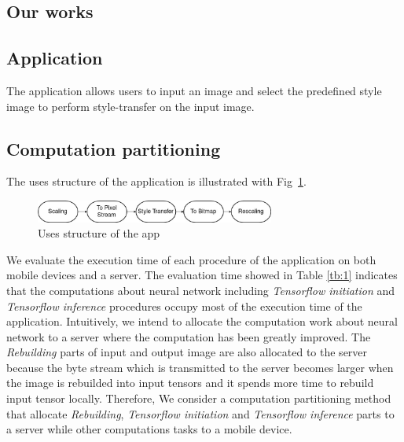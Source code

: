 \documentclass[a4paper,11pt,onecolumn,twoside]{article}
\begin{document}
\begin{CJK*}{GBK}{song}
\section{Our works}
\subsection{Application}
The application allows users to input an image and select the predefined
style image to perform style-transfer on the input image. 


\subsection{Computation partitioning}

The uses structure of the application is illustrated with Fig~\ref{uses}.

\begin{figure}[!htb] %
  \centering %
  \includegraphics[width=0.7\textwidth]{uses} %
  \caption{Uses structure of the app} %
  \label{uses} %
\end{figure}

We evaluate the execution time of each procedure of the application
on both mobile devices and a server.
The evaluation time showed in Table \ref{tb:1} indicates that the 
computations about neural network including 
\textit{Tensorflow initiation}
and \textit{Tensorflow inference}\cite{tensorflow2015-whitepaper} 
procedures occupy most of the execution time of the application. 
Intuitively, we intend to allocate the computation
work about neural network to a server where 
the computation has been greatly improved.
The \textit{Rebuilding} parts of input and output image are also
allocated to the server because the byte stream which is transmitted
to the server becomes larger when the image is rebuilded into 
input tensors and it spends more time to rebuild input tensor locally.
Therefore, We consider a computation partitioning method that
allocate \textit{Rebuilding}, \textit{Tensorflow initiation}
  and \textit{Tensorflow inference} parts 
  to a server while other computations tasks to a mobile device.



\end{CJK*}
\end{document}
